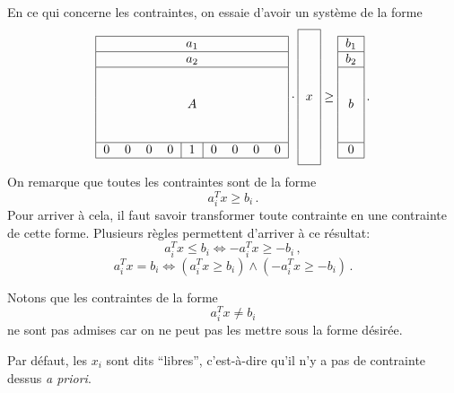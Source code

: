 	En ce qui concerne les contraintes,
	on essaie d'avoir un système de la forme
	\[
	\begin{tabular}{|ccccccccc|}
		\hline
		\multicolumn{9}{|c|}{$a_1$} \\
		\hline
		\multicolumn{9}{|c|}{$a_2$} \\
		\hline
		\multicolumn{9}{|c|}{\multirow{5}{*}{$A$}}
		\\
		&&&&&&&&\\
		&&&&&&&&\\
		&&&&&&&&\\
		&&&&&&&&\\
		\hline
		0 & 0 & 0 & 0 & \multicolumn{1}{|c|}{1} & 0 & 0 & 0 & 0 \\
		\hline
	\end{tabular}
	\cdot
	\begin{tabular}{|c|}
		\hline
		\multirow{9}{*}{$x$}
		\\
		\\
		\\
		\\
		\\
		\\
		\\
		\\
		\\
		\hline
	\end{tabular}
	\ge
	\begin{tabular}{|c|}
		\hline
		$b_1$ \\
		\hline
		$b_2$ \\
		\hline
		\multirow{5}{*}{$b$}
		\\
		\\
		\\
		\\
		\\
		\hline
		0 \\
		\hline
	\end{tabular}\,.
	\]
	On remarque que toutes les contraintes sont de la forme
	\[
	a_i^T x \ge b_i\,.
	\]
	Pour arriver à cela,
	il faut savoir transformer toute contrainte
	en une contrainte de cette forme.
	Plusieurs règles permettent d'arriver à ce résultat:
	\[
	a_i^T x \le b_i \iff -a_i^T x \ge -b_i\,,
	\]
	\[
	a_i^T x = b_i \iff \left(a_i^T x \ge b_i\right) \land \left(-a_i^T x \ge -b_i\right)\,.
	\]

	Notons que les contraintes de la forme
	\[
	a_i^T x \ne b_i
	\]
	ne sont pas admises car on ne peut pas les mettre sous la forme désirée.

	Par défaut, les $x_i$ sont dits ``libres'',
	c'est-à-dire qu'il n'y a pas de contrainte dessus \textit{a priori}.

